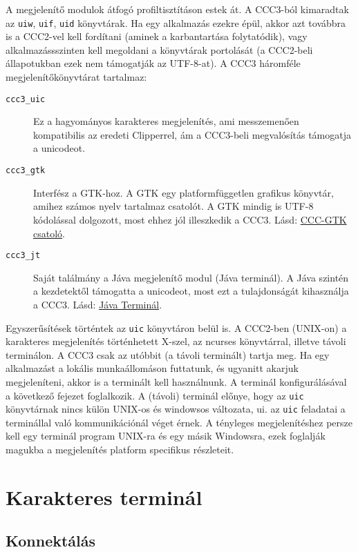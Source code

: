 A megjelenítő modulok átfogó profiltisztításon estek át.
A CCC3-ból kimaradtak az \verb!uiw!, \verb!uif!, \verb!uid! könyvtárak. 
Ha egy alkalmazás ezekre épül, akkor azt továbbra is a CCC2-vel kell 
fordítani (aminek a karbantartása folytatódik), vagy alkalmazássszinten 
kell megoldani a könyvtárak portolását (a CCC2-beli állapotukban ezek nem
támogatják az UTF-8-at). 
A CCC3 háromféle megjelenítőkönyvtárat tartalmaz:
\begin{description} 
\item[{\tt ccc3\_uic}]
    Ez a hagyományos karakteres megjelenítés,
    ami messzemenően kompatibilis az eredeti Clipperrel, 
    ám a CCC3-beli megvalósítás támogatja a unicodeot.
\item[{\tt ccc3\_gtk}]
    Interfész a GTK-hoz. A GTK egy platformfüggetlen 
    grafikus könyvtár, amihez számos nyelv tartalmaz 
    csatolót. A GTK mindig is UTF-8 kódolással dolgozott,
    most ehhez jól illeszkedik a CCC3.
    Lásd: \href{cccgtk.html}{CCC-GTK csatoló}.
\item[{\tt ccc3\_jt}]
    Saját találmány a Jáva megjelenítő modul (Jáva terminál).
    A Jáva szintén a kezdetektől támogatta a unicodeot,
    most ezt a tulajdonságát kihasználja a CCC3.
    Lásd: \href{jterminal.html}{Jáva Terminál}.
\end{description} 

Egyszerűsítések történtek az \verb!uic! könyvtáron belül is.
A CCC2-ben (UNIX-on) a karakteres megjelenítés történhetett
X-szel, az ncurses könyvtárral, illetve távoli terminálon.
A CCC3 csak az utóbbit (a távoli terminált) tartja meg.
Ha egy alkalmazást a lokális munkaállomáson futtatunk,
és ugyanitt akarjuk megjeleníteni, akkor is a terminált
kell használnunk. A terminál konfigurálásával a következő
fejezet foglalkozik.  A (távoli) terminál előnye, 
hogy az \verb!uic! könyvtárnak nincs külön UNIX-os
és windowsos változata, ui. az \verb!uic! feladatai a terminállal
való kommunikációnál véget érnek.
A tényleges megjelenítéshez persze kell egy terminál program 
UNIX-ra és egy másik Windowsra, ezek foglalják magukba a
megjelenítés platform specifikus részleteit.

\section{Karakteres terminál}

\subsection{Konnektálás}

